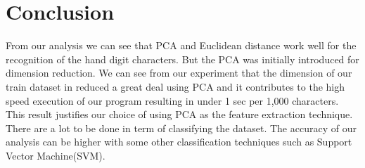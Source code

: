 \section{Conclusion}
\label{sect:conclusion}
From our analysis we can see that PCA and Euclidean distance work well for the recognition of the hand digit characters. But the PCA was initially introduced for dimension reduction. We can see from our experiment that the dimension of our train dataset in reduced a great deal using PCA and it contributes to the high speed execution of our program resulting in under 1 sec per 1,000 characters. This result justifies our choice of using PCA as the feature extraction technique. There are a lot to be done in term of classifying the dataset. The accuracy of our analysis can be higher with some other classification techniques such as Support Vector Machine(SVM).  